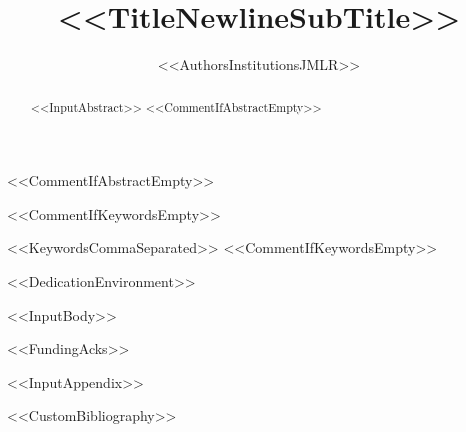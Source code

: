 \documentclass[%
twoside,
11pt,
<<DocumentClassOptions>>]{article}
\title{<<TitleNewlineSubTitle>>}
\author{%
<<AuthorsInstitutionsJMLR>>
}
\begin{document}
\maketitle

<<CommentIfAbstractEmpty>>\begin{abstract}
<<InputAbstract>>
<<CommentIfAbstractEmpty>>\end{abstract}

<<CommentIfKeywordsEmpty>>\begin{keywords}
<<KeywordsCommaSeparated>>
<<CommentIfKeywordsEmpty>>\end{keywords}

<<DedicationEnvironment>>

<<InputBody>>

<<FundingAcks>>

\appendix
<<InputAppendix>>

<<CustomBibliography>>
\end{document}
